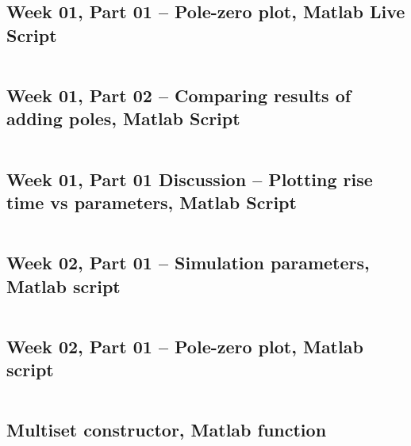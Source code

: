 \documentclass[12pt]{article}
\begin{document}
\subsection{Week 01, Part 01 -- Pole-zero plot, Matlab Live Script}\label{sap:pzplot}
\inputminted{matlab}{src/part01a_pzplot_mlx.m}

\subsection{Week 01, Part 02 -- Comparing results of adding poles, Matlab Script}\label{sap:adding poles}
\inputminted{matlab}{src/part02_adding_poles.m}

\subsection{Week 01, Part 01 Discussion -- Plotting rise time vs parameters, Matlab Script}\label{sap:rise time vs parameters}
\inputminted{matlab}{src/part01_rise_time_vs_parameters_plot.m}

\subsection{Week 02, Part 01 -- Simulation parameters, Matlab script}\label{sap:params}
\inputminted{matlab}{src/week02_simulation_params.m}

\subsection{Week 02, Part 01 -- Pole-zero plot, Matlab script}\label{sap:pzplot 2}
\inputminted{matlab}{src/week02_part01_pzplot.m}

\subsection{Multiset constructor, Matlab function}\label{sap:multiset}
\inputminted{matlab}{src/multiset.m}
\end{document}

